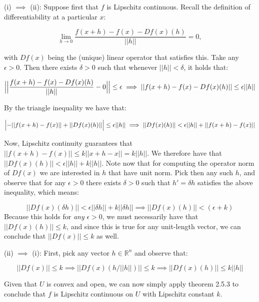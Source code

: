 \begin{solution}
    
    (i) $\implies$ (ii): Suppose first that $f$ is Lipschitz continuous.
    Recall the definition of differentiability at a particular $x$:

    $$\lim_{h \rightarrow 0} \frac{f(x + h) - f(x) - D f(x)(h)}{\lvert \lvert h \rvert \rvert} = 0,$$

    with $Df(x)$ being the (unique) linear operator that satisfies this.
    Take any $\epsilon > 0$.
    Then there exists $\delta > 0$ such that whenever $\lvert \lvert h \rvert \rvert < \delta$, it holds that:

    $$\Bigl\lvert \Bigl\lvert \frac{f(x + h) - f(x) - Df(x)(h)}{\lvert \lvert h \rvert \rvert} - 0 \Bigr \rvert \Bigr \rvert \leq \epsilon \implies \lvert \lvert f(x + h) - f(x) - Df(x)(h) \rvert \rvert \leq \epsilon \lvert \lvert h \rvert \rvert$$

    By the triangle inequality we have that:

    $$\Bigl \lvert - \lvert \lvert f(x+h) - f(x) \rvert \rvert + \lvert \lvert Df(x)(h) \rvert \rvert \Bigr \rvert \leq \epsilon \lvert \lvert h \rvert \rvert \implies \lvert \lvert Df(x)(h) \rvert \rvert < \epsilon \lvert \lvert h \rvert \rvert + \lvert \lvert f(x+h) - f(x) \rvert \rvert$$

    Now, Lipschitz continuity guarantees that $\lvert \lvert f(x+h) - f(x) \rvert \rvert \leq k \lvert \lvert x + h - x \rvert \rvert = k \lvert \lvert h \rvert \rvert$.
    We therefore have that $\lvert \lvert Df(x)(h) \rvert \rvert < \epsilon \lvert \lvert h \rvert \rvert + k \lvert \lvert h \rvert \rvert$.
    Note now that for computing the operator norm of $Df(x)$ we are interested in $h$ that have unit norm.
    Pick then any such $h$, and observe that for any $\epsilon > 0$ there exists $\delta > 0$ such that $h' = \delta h$ satisfies the above inequality, which means:

    $$\lvert \lvert Df(x)(\delta h) \rvert \rvert < \epsilon \lvert \lvert \delta h \rvert \rvert + k \lvert \lvert \delta h \rvert \rvert \implies \lvert \lvert Df(x)(h) \rvert \rvert < (\epsilon + k)$$
    Because this holds for \textit{any} $\epsilon > 0$, we must necessarily have that $\lvert \lvert Df(x)(h) \rvert \rvert \leq k$, and since this is true for any unit-length vector, we can conclude that $\lvert \lvert Df(x) \rvert \rvert \leq k$ as well.

    (ii) $\implies$ (i): First, pick any vector $h \in \mathbb{R}^n$ and observe that:

    $$\lvert \lvert Df(x) \rvert \rvert \leq k \implies \lvert \lvert Df(x)(h/ \lvert \lvert h \rvert \rvert) \rvert \rvert \leq k \implies \lvert \lvert Df(x)(h) \rvert \rvert \leq k \lvert \lvert h \rvert \rvert$$ 

    Given that $U$ is convex and open, we can now simply apply theorem 2.5.3 to conclude that $f$ is Lipschitz continuous on $U$ with Lipschitz constant $k$.
\end{solution}

